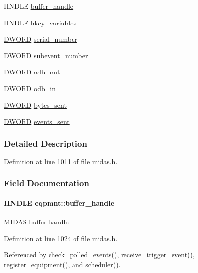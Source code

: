 \begin{DoxyCompactItemize}
\item 
HNDLE \hyperlink{structeqpmnt_a7a77ffb95300f3c7fcc7fbcc141dd820}{buffer\_\-handle}
\item 
HNDLE \hyperlink{structeqpmnt_ab6664c255e4c3fdc58806733ac04503b}{hkey\_\-variables}
\item 
\hyperlink{vt2_8h_a798af1e30bc65f319c1a246cecf59e39}{DWORD} \hyperlink{structeqpmnt_a1eeffec216604567e3ddbed40cbb0a15}{serial\_\-number}
\item 
\hyperlink{vt2_8h_a798af1e30bc65f319c1a246cecf59e39}{DWORD} \hyperlink{structeqpmnt_a1649c4fed8b7c97441a167a860cae4af}{subevent\_\-number}
\item 
\hyperlink{vt2_8h_a798af1e30bc65f319c1a246cecf59e39}{DWORD} \hyperlink{structeqpmnt_a2ba622da82fc7a02605e5f630464b13f}{odb\_\-out}
\item 
\hyperlink{vt2_8h_a798af1e30bc65f319c1a246cecf59e39}{DWORD} \hyperlink{structeqpmnt_ab487ff66b0ceb7677a3e664717158c51}{odb\_\-in}
\item 
\hyperlink{vt2_8h_a798af1e30bc65f319c1a246cecf59e39}{DWORD} \hyperlink{structeqpmnt_a2d00b43d76412e41d7f10c1cb786eade}{bytes\_\-sent}
\item 
\hyperlink{vt2_8h_a798af1e30bc65f319c1a246cecf59e39}{DWORD} \hyperlink{structeqpmnt_a448c8840590d36b3a828ff1ec0c8a65c}{events\_\-sent}
\end{DoxyCompactItemize}


\subsubsection{Detailed Description}


Definition at line 1011 of file midas.h.

\subsubsection{Field Documentation}
\paragraph[{buffer\_\-handle}]{\setlength{\rightskip}{0pt plus 5cm}HNDLE {\bf eqpmnt::buffer\_\-handle}}\hfill\label{structeqpmnt_a7a77ffb95300f3c7fcc7fbcc141dd820}
MIDAS buffer handle 

Definition at line 1024 of file midas.h.

Referenced by check\_\-polled\_\-events(), receive\_\-trigger\_\-event(), register\_\-equipment(), and scheduler().
